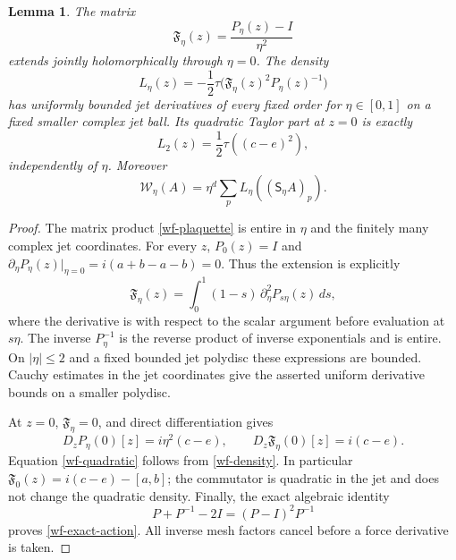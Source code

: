\documentclass[11pt]{article}
\newtheorem{lemma}[theorem]{Lemma}
\theoremstyle{remark}
\begin{document}
\begin{lemma}\label{wf-removable}
The matrix
\[
 \mathfrak F_\eta(z)=\frac{P_\eta(z)-I}{\eta^2}
\]
extends jointly holomorphically through $\eta=0$. The density
\begin{equation}\label{wf-density}
 L_\eta(z)=-\frac12\tau\bigl(\mathfrak F_\eta(z)^2
                                              P_\eta(z)^{-1}\bigr)
\end{equation}
has uniformly bounded jet derivatives of every fixed order
for $\eta\in[0,1]$ on a fixed smaller complex jet ball. Its
quadratic Taylor part at $z=0$ is exactly
\begin{equation}\label{wf-quadratic}
 L_2(z)=\frac12\tau((c-e)^2),
\end{equation}
independently of $\eta$. Moreover
\begin{equation}\label{wf-exact-action}
 \mathcal W_\eta(A)=\eta^d\sum_p
                           L_\eta((\mathsf S_\eta A)_p).
\end{equation}
\end{lemma}

\begin{proof}
The matrix product \eqref{wf-plaquette} is entire in $\eta$
and the finitely many complex jet coordinates. For every $z$,
$P_0(z)=I$ and
$\partial_\eta P_\eta(z)|_{\eta=0}=i(a+b-a-b)=0$.
Thus the extension is explicitly
\begin{equation}\label{wf-removable-integral}
 \mathfrak F_\eta(z)
  =\int_0^1(1-s)\,\partial_\eta^2P_{s\eta}(z)\,ds,
\end{equation}
where the derivative is with respect to the scalar argument
before evaluation at $s\eta$. The inverse $P_\eta^{-1}$ is
the reverse product of inverse exponentials and is entire.
On $|\eta|\le2$ and a fixed bounded jet polydisc these
expressions are bounded. Cauchy estimates in the jet
coordinates give the asserted uniform derivative bounds
on a smaller polydisc.

At $z=0$, $\mathfrak F_\eta=0$, and direct differentiation
gives
\begin{equation}\label{wf-linear-F}
 D_zP_\eta(0)[z]=i\eta^2(c-e),\qquad
 D_z\mathfrak F_\eta(0)[z]=i(c-e).
\end{equation}
Equation \eqref{wf-quadratic} follows from
\eqref{wf-density}. In particular
$\mathfrak F_0(z)=i(c-e)-[a,b]$; the commutator is quadratic
in the jet and does not change the quadratic density.
Finally, the exact algebraic identity
\[
 P+P^{-1}-2I=(P-I)^2P^{-1}
\]
proves \eqref{wf-exact-action}. All inverse mesh factors
cancel before a force derivative is taken.
\end{proof}
\end{document}
